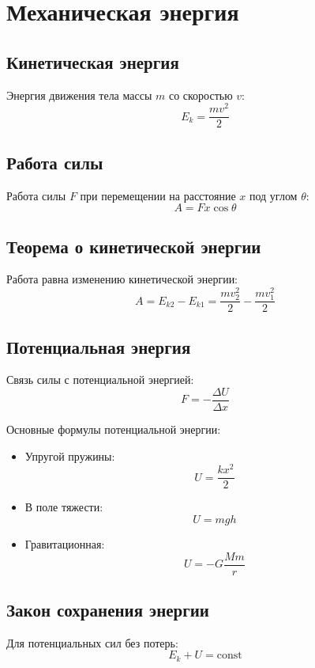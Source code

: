 \documentclass[12pt]{article}
\begin{document}
\section*{Механическая энергия}

\subsection*{Кинетическая энергия}
Энергия движения тела массы $m$ со скоростью $v$:
\[E_k = \frac{m v^2}{2}\]

\subsection*{Работа силы}
Работа силы $F$ при перемещении на расстояние $x$ под углом $\theta$:
\[A = Fx\cos\theta\]

\subsection*{Теорема о кинетической энергии}
Работа равна изменению кинетической энергии:
\[A = E_{k2} - E_{k1} = \frac{m v_2^2}{2} - \frac{m v_1^2}{2}\]

\subsection*{Потенциальная энергия}
Связь силы с потенциальной энергией:
\[F = -\frac{\Delta U}{\Delta x}\]

Основные формулы потенциальной энергии:
\begin{itemize}
\item Упругой пружины: \[U = \frac{k x^2}{2}\]
\item В поле тяжести: \[U = mgh\]
\item Гравитационная: \[U = -G\frac{M m}{r}\]
\end{itemize}

\subsection*{Закон сохранения энергии}
Для потенциальных сил без потерь:
\[E_k + U = \text{const}\]
\end{document}
